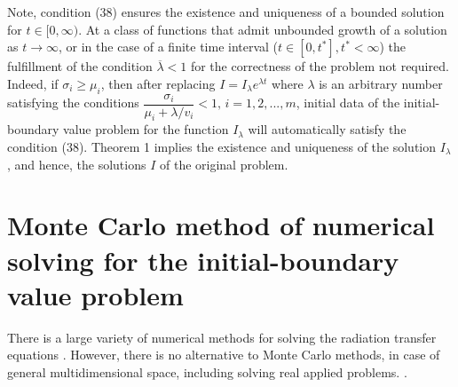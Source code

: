 \documentclass[12pt,reqno]{report}
\begin{document}
Note, condition (38) ensures the existence and
uniqueness of a bounded solution for $ t \in [0, \infty) $. 
At a class of functions that admit unbounded growth of a solution as $ t
\to \infty $, or in the case of a finite time interval ($ t \in [0, t ^ *], t ^ * <
\infty $) the fulfillment of the condition $ \overline {\lambda} <1 $ for the correctness of the problem
not required. Indeed, if $ \sigma_i \geq \mu_i $, then after replacing $ I = I _ {\lambda} e ^ {\lambda t} $
where $ \lambda $ is an arbitrary number satisfying the conditions
$ \dfrac {\sigma_i} {\mu_i + \lambda / v_i} <1, \, i = 1,2, ..., m $,
initial data of the initial-boundary value problem for the function $ I _ {\lambda} $
will automatically satisfy the condition (38). Theorem 1 implies
the existence and uniqueness of the solution $ I _ {\lambda} $, and
hence, the solutions $ I $ of the original problem.




\section{Monte Carlo method of numerical solving for the initial-boundary value problem}
There is a large variety of numerical methods for solving the radiation transfer equations 
\cite{1,2,3,4,5,12,13,14,15,16,17,18,19}. However, there is no alternative to Monte Carlo methods,
in case of general multidimensional space, including solving real applied problems.
\cite{34}. 
\end{document}
